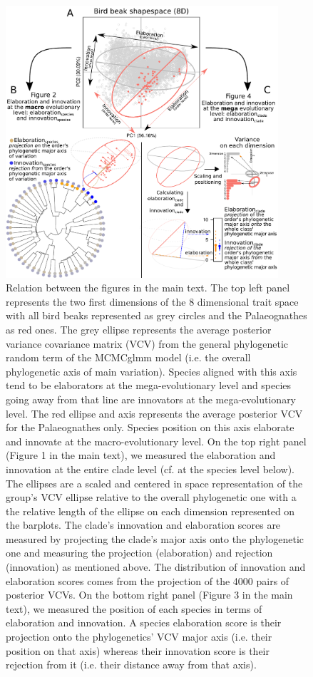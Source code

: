 \documentclass[sn-mathphys]{sn-jnl}%
\theoremstyle{thmstyleone}%
\theoremstyle{thmstyletwo}%
\theoremstyle{thmstylethree}%
\begin{document}
\begin{figure}[!htbp]
\centering
   \includegraphics[width=0.9\textwidth]{Figures/cheat_sheet.pdf}
\caption{Relation between the figures in the main text.
The top left panel represents the two first dimensions of the 8 dimensional trait space with all bird beaks represented as grey circles and the Palaeognathes as red ones.
The grey ellipse represents the average posterior variance covariance matrix (VCV) from the general phylogenetic random term of the MCMCglmm model (i.e. the overall phylogenetic axis of main variation).
Species aligned with this axis tend to be elaborators at the mega-evolutionary level and species going away from that line are innovators at the mega-evolutionary level.
The red ellipse and axis represents the average posterior VCV for the Palaeognathes only.
Species position on this axis elaborate and innovate at the macro-evolutionary level.
On the top right panel (Figure 1 in the main text), we measured the elaboration and innovation at the entire clade level (cf. at the species level below).
The ellipses are a scaled and centered in space representation of the group’s VCV ellipse relative to the overall phylogenetic one with a the relative length of the ellipse on each dimension represented on the barplots.
The clade's innovation and elaboration scores are measured by projecting the clade's major axis onto the phylogenetic one and measuring the projection (elaboration) and rejection (innovation) as mentioned above.
The distribution of innovation and elaboration scores comes from the projection of the 4000 pairs of posterior VCVs.
On the bottom right panel (Figure 3 in the main text), we measured the position of each species in terms of elaboration and innovation.
A species elaboration score is their projection onto the phylogenetics' VCV major axis (i.e. their position on that axis) whereas their innovation score is their rejection from it (i.e. their distance away from that axis).}
\label{Fig:cheat_sheet}
\end{figure}
\end{document}
